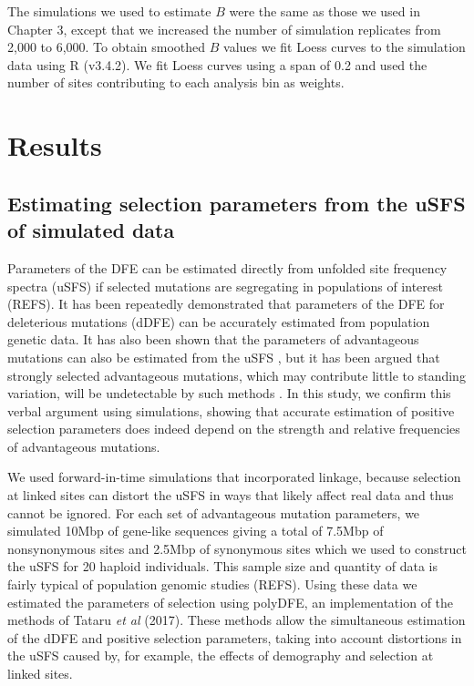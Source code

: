  	The simulations we used to estimate $B$ were the same as those we used in Chapter 3, except that we increased the number of simulation replicates from 2,000 to 6,000. To obtain smoothed $B$ values we fit Loess curves to the simulation data using R (v3.4.2). We fit Loess curves using a span of 0.2 and used the number of sites contributing to each analysis bin as weights.

%
%

\section{Results}
%
\subsection{Estimating selection parameters from the uSFS of simulated data}

	Parameters of the DFE can be estimated directly from unfolded site frequency spectra (uSFS) if selected mutations are segregating in populations of interest (REFS). It has been repeatedly demonstrated that parameters of the DFE for deleterious mutations (dDFE) can be accurately estimated from population genetic data. It has also been shown that the parameters of advantageous mutations can also be estimated from the uSFS \citep{RN210, RN354}, but it has been argued that strongly selected advantageous mutations, which may contribute little to standing variation, will be undetectable by such methods \citep{RN323}. In this study, we confirm this verbal argument using simulations, showing that accurate estimation of positive selection parameters does indeed depend on the strength and relative frequencies of advantageous mutations.
	
	We used forward-in-time simulations that incorporated linkage, because selection at linked sites can distort the uSFS in ways that likely affect real data and thus cannot be ignored. For each set of advantageous mutation parameters, we simulated 10Mbp of gene-like sequences giving a total of 7.5Mbp of nonsynonymous sites and 2.5Mbp of synonymous sites which we used to construct the uSFS for 20 haploid individuals. This sample size and quantity of data is fairly typical of population genomic studies (REFS). Using these data we estimated the parameters of selection using polyDFE, an implementation of the methods of Tataru \textit{et al} (2017). These methods allow the simultaneous estimation of the dDFE and positive selection parameters, taking into account distortions in the uSFS caused by, for example, the effects of demography and selection at linked sites. 

